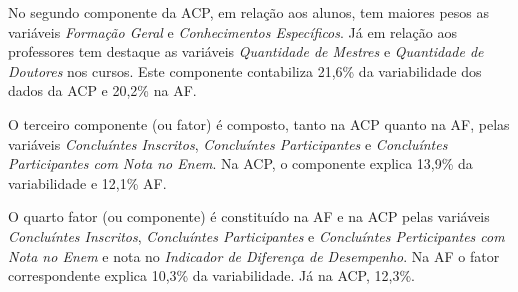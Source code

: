 

No segundo componente da ACP, em relação aos alunos, tem maiores pesos as variáveis \textit{Formação Geral} e \textit{Conhecimentos Específicos}. Já em relação aos professores tem destaque as variáveis \textit{Quantidade de Mestres} e \textit{Quantidade de Doutores} nos cursos. Este componente contabiliza 21,6\% da variabilidade dos dados da ACP e 20,2\% na AF.

O terceiro componente (ou fator) é composto, tanto na ACP quanto na AF, pelas variáveis \textit{Concluíntes Inscritos}, \textit{Concluíntes Participantes} e \textit{Concluíntes Participantes com Nota no Enem}. Na ACP, o componente explica 13,9\% da variabilidade e 12,1\% AF.

O quarto fator (ou componente) é constituído na AF e na ACP pelas variáveis \textit{Concluíntes Inscritos}, \textit{Concluíntes Participantes} e \textit{Concluíntes Perticipantes com Nota no Enem} e nota no \textit{Indicador de Diferença de Desempenho}. Na AF o fator correspondente explica 10,3\% da variabilidade. Já na ACP, 12,3\%.

\pagebreak